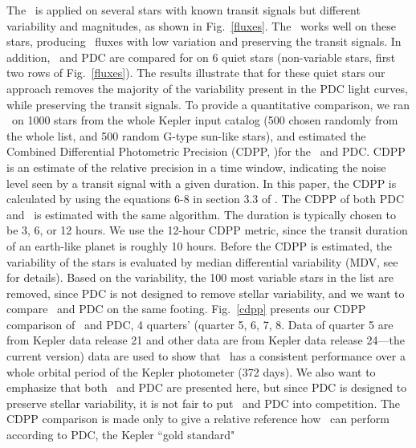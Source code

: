 The \name\ is applied on several stars with known transit signals but different variability and magnitudes, as shown in Fig.~\ref{fluxes}. 
The \name\ works well on these stars, producing \name\ fluxes 
with low variation and preserving the transit signals.
In addition, \name\ and PDC are compared for on 6 quiet stars 
(non-variable stars, first two rows of Fig.~\ref{fluxes}). 
The results illustrate that for these quiet stars our approach removes the majority of the variability present in the PDC light curves, while preserving the transit signals. 
To provide a quantitative comparison, we ran \name\ on 1000 stars from the whole Kepler input catalog 
(500 chosen randomly from the whole list, and 500 random G-type sun-like stars), 
and estimated the Combined Differential Photometric Precision (CDPP,  \citealt{cdpp1} )for the \name\ and PDC.  
CDPP is an estimate of the relative precision in a time window, 
indicating the noise level seen by a transit signal with a given duration. 
In this paper, the CDPP is calculated by using the equations 6-8 in section 3.3 of \citealt{cdpp1}. The CDPP of both PDC and \name\ is estimated with the same algorithm.
The duration is typically chosen to be 3, 6, or 12 hours. 
We use the 12-hour CDPP metric, since the transit duration of an earth-like planet is roughly 10 hours. 
Before the CDPP is estimated, the variability of the stars is evaluated by median differential variability 
  (MDV, see \citealt{basri2013} for details). 
Based on the variability, the 100 most variable stars in the list are removed, 
  since PDC is not designed to remove stellar variability, 
  and we want to compare \name\ and PDC on the same footing.
Fig.~\ref{cdpp} presents our CDPP comparison of \name\ and PDC, 4 quarters' (quarter 5, 6, 7, 8. Data of quarter 5 are from Kepler data release 21 and other data are from Kepler data release 24---the current version) data are used to show that \name\ has a consistent performance over a whole orbital period of the Kepler photometer (372 days). We also want to emphasize that both \name\ and PDC are presented here, but since PDC is designed to preserve stellar variability, it is not fair to put \name\ and PDC into competition. The CDPP comparison is made only to give a relative reference how \name\ can perform according to PDC, the Kepler ``gold standard"

